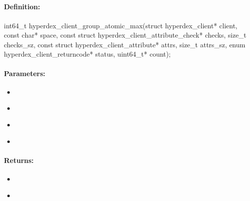 \pagebreak
\subsection{}
\label{api:c:group_atomic_max}


\paragraph{Definition:}
\begin{ccode}
int64_t hyperdex_client_group_atomic_max(struct hyperdex_client* client,
        const char* space,
        const struct hyperdex_client_attribute_check* checks, size_t checks_sz,
        const struct hyperdex_client_attribute* attrs, size_t attrs_sz,
        enum hyperdex_client_returncode* status,
        uint64_t* count);
\end{ccode}

\paragraph{Parameters:}
\begin{itemize}[noitemsep]
\item {}\\

\item {}\\

\item {}\\

\item {}\\

\end{itemize}

\paragraph{Returns:}
\begin{itemize}[noitemsep]
\item {}\\

\item {}\\

\end{itemize}

